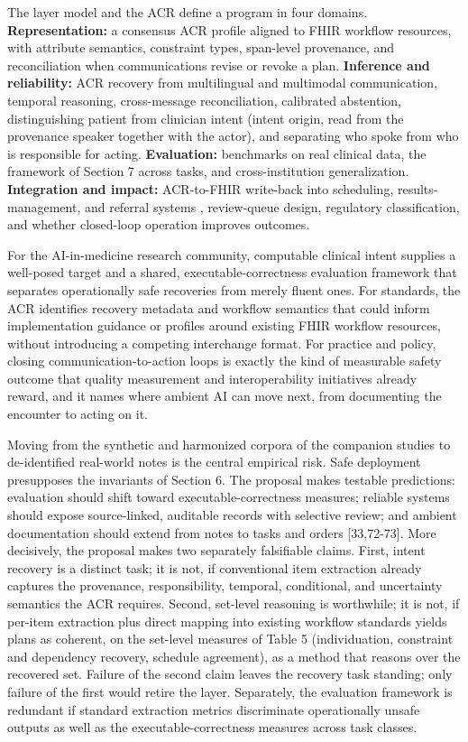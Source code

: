 The layer model and the ACR define a program in four domains. \textbf{Representation:} a consensus ACR profile aligned to FHIR workflow resources, with attribute semantics, constraint types, span-level provenance, and reconciliation when communications revise or revoke a plan. \textbf{Inference and reliability:} ACR recovery from multilingual and multimodal communication, temporal reasoning, cross-message reconciliation, calibrated abstention, distinguishing patient from clinician intent (intent origin, read from the provenance speaker together with the actor), and separating who spoke from who is responsible for acting. \textbf{Evaluation:} benchmarks on real clinical data, the framework of Section 7 across tasks, and cross-institution generalization. \textbf{Integration and impact:} ACR-to-FHIR write-back into scheduling, results-management, and referral systems \cite{ref23}, review-queue design, regulatory classification, and whether closed-loop operation improves outcomes.

For the AI-in-medicine research community, computable clinical intent supplies a well-posed target and a shared, executable-correctness evaluation framework that separates operationally safe recoveries from merely fluent ones. For standards, the ACR identifies recovery metadata and workflow semantics that could inform implementation guidance or profiles around existing FHIR workflow resources, without introducing a competing interchange format. For practice and policy, closing communication-to-action loops is exactly the kind of measurable safety outcome that quality measurement and interoperability initiatives already reward, and it names where ambient AI can move next, from documenting the encounter to acting on it.

Moving from the synthetic and harmonized corpora of the companion studies to de-identified real-world notes is the central empirical risk. Safe deployment presupposes the invariants of Section 6. The proposal makes testable predictions: evaluation should shift toward executable-correctness measures; reliable systems should expose source-linked, auditable records with selective review; and ambient documentation should extend from notes to tasks and orders {[}33,72-73{]}. More decisively, the proposal makes two separately falsifiable claims. First, intent recovery is a distinct task; it is not, if conventional item extraction already captures the provenance, responsibility, temporal, conditional, and uncertainty semantics the ACR requires. Second, set-level reasoning is worthwhile; it is not, if per-item extraction plus direct mapping into existing workflow standards yields plans as coherent, on the set-level measures of Table 5 (individuation, constraint and dependency recovery, schedule agreement), as a method that reasons over the recovered set. Failure of the second claim leaves the recovery task standing; only failure of the first would retire the layer. Separately, the evaluation framework is redundant if standard extraction metrics discriminate operationally unsafe outputs as well as the executable-correctness measures across task classes.

